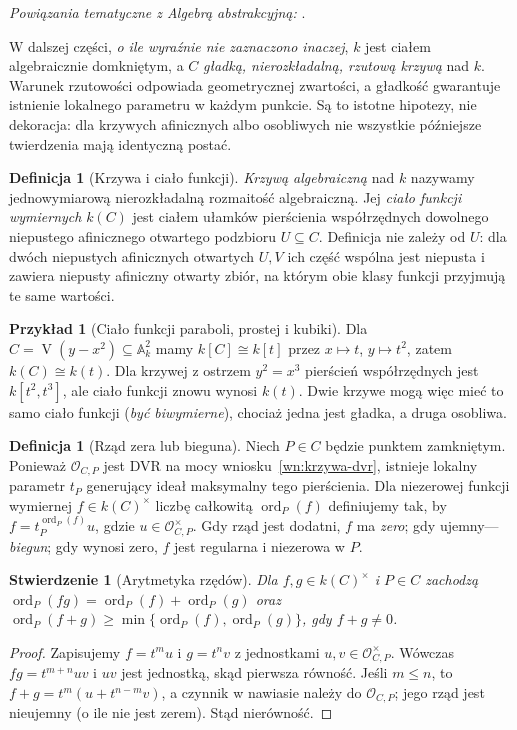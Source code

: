 \documentclass[11pt,a4paper,openany]{report}
\numberwithin{equation}{section}
\theoremstyle{plain}
\newtheorem{stwierdzenie}[twierdzenie]{Stwierdzenie}
\theoremstyle{definition}
\newtheorem{definicja}[twierdzenie]{Definicja}
\newtheorem{przyklad}[twierdzenie]{Przykład}
\theoremstyle{remark}
\newcommand{\A}{\mathbb A}
\newcommand{\V}{\operatorname V}
\begin{document}
\noindent\emph{Powiązania tematyczne z Algebrą abstrakcyjną:} .


W dalszej części, \emph{o ile wyraźnie nie zaznaczono
inaczej}, $k$ jest ciałem algebraicznie domkniętym,
a $C$ \emph{gładką, nierozkładalną, rzutową krzywą}
nad $k$. Warunek rzutowości odpowiada geometrycznej
zwartości, a gładkość gwarantuje istnienie lokalnego
parametru w każdym punkcie. Są to istotne hipotezy,
nie dekoracja: dla krzywych afinicznych albo osobliwych
nie wszystkie późniejsze twierdzenia mają identyczną postać.

\begin{definicja}[Krzywa i ciało funkcji]
\emph{Krzywą algebraiczną} nad $k$ nazywamy
jednowymiarową nierozkładalną rozmaitość algebraiczną.
Jej \emph{ciało funkcji wymiernych} $k(C)$ jest
ciałem ułamków pierścienia współrzędnych dowolnego
niepustego afinicznego otwartego podzbioru $U\subseteq C$.
Definicja nie zależy od $U$: dla dwóch niepustych
afinicznych otwartych $U,V$ ich część wspólna jest
niepusta i zawiera niepusty afiniczny otwarty zbiór,
na którym obie klasy funkcji przyjmują te same wartości.
\end{definicja}

\begin{przyklad}[Ciało funkcji paraboli, prostej i kubiki]
Dla $C=\V(y-x^2)\subseteq\A^2_k$ mamy
$k[C]\cong k[t]$ przez $x\mapsto t$, $y\mapsto t^2$,
zatem $k(C)\cong k(t)$. Dla krzywej z ostrzem
$y^2=x^3$ pierścień współrzędnych jest
$k[t^2,t^3]$, ale ciało funkcji znowu wynosi $k(t)$.
Dwie krzywe mogą więc mieć to samo ciało funkcji
(\emph{być biwymierne}), chociaż jedna jest gładka,
a druga osobliwa.
\end{przyklad}

\begin{definicja}[Rząd zera lub bieguna]
\label{def:ord}
Niech $P\in C$ będzie punktem zamkniętym.
Ponieważ $\mathcal O_{C,P}$ jest DVR na mocy
wniosku~\ref{wn:krzywa-dvr}, istnieje lokalny parametr
$t_P$ generujący ideał maksymalny tego pierścienia.
Dla niezerowej funkcji wymiernej $f\in k(C)^\times$
liczbę całkowitą $\operatorname{ord}_P(f)$ definiujemy
tak, by $f=t_P^{\operatorname{ord}_P(f)}u$,
gdzie $u\in\mathcal O_{C,P}^\times$.
Gdy rząd jest dodatni, $f$ ma \emph{zero}; gdy
ujemny---\emph{biegun}; gdy wynosi zero, $f$
jest regularna i niezerowa w $P$.
\end{definicja}

\begin{stwierdzenie}[Arytmetyka rzędów]
Dla $f,g\in k(C)^\times$ i $P\in C$ zachodzą
$\operatorname{ord}_P(fg)=\operatorname{ord}_P(f)+
\operatorname{ord}_P(g)$ oraz
$\operatorname{ord}_P(f+g)\ge\min
\{\operatorname{ord}_P(f),\operatorname{ord}_P(g)\}$,
gdy $f+g\ne0$.
\end{stwierdzenie}
\begin{proof}
Zapisujemy $f=t^m u$ i $g=t^n v$ z jednostkami
$u,v\in\mathcal O_{C,P}^\times$. Wówczas
$fg=t^{m+n}uv$ i $uv$ jest jednostką, skąd
pierwsza równość. Jeśli $m\le n$, to
$f+g=t^m(u+t^{n-m}v)$, a czynnik w nawiasie
należy do $\mathcal O_{C,P}$; jego rząd jest
nieujemny (o ile nie jest zerem). Stąd nierówność.
\end{proof}
\end{document}

